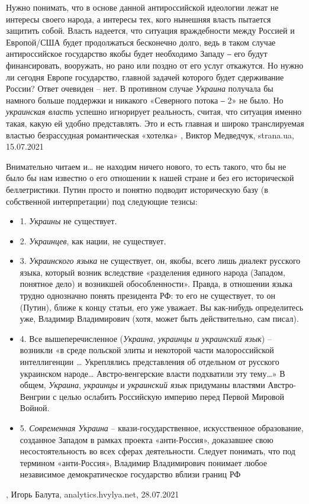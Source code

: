 Нужно понимать, что в основе данной антироссийской идеологии лежат не интересы
своего народа, а интересы тех, кого нынешняя власть пытается защитить собой.
Власть надеется, что ситуация враждебности между Россией и Европой/США будет
продолжаться бесконечно долго, ведь в таком случае антироссийское государство
якобы будет необходимо Западу ‒ его будут финансировать, вооружать, но рано или
поздно от его услуг откажутся.  Но нужно ли сегодня Европе государство, главной
задачей которого будет сдерживание России? Ответ очевиден – нет. В противном
случае \emph{Украина} получала бы намного больше поддержки и никакого
«Северного потока ‒ 2» не было. Но \emph{украинская власть} успешно игнорирует
реальность, считая, что ситуация именно такая, какую ей удобно представлять.
Это и есть главная и широко транслируемая властью безрассудная романтическая
«хотелка»
, 
Виктор Медведчук, strana.ua, 15.07.2021

Внимательно читаем и… не находим ничего нового, то есть такого, что бы не было
бы нам известно о его отношении к нашей стране и без его исторической
беллетристики. Путин просто и понятно подводит историческую базу (в собственной
интерпретации) под следующие тезисы:
\begin{itemize}
\item 1. \emph{Украины} не существует.
\item 2. \emph{Украинцев}, как нации, не существует.
\item 3. \emph{Украинского языка} не существует, он, якобы, всего лишь диалект русского
языка, который возник вследствие «разделения единого народа (Западом, понятное
дело) и возникшей обособленности». Правда, в отношении языка трудно однозначно
понять президента РФ: то его не существует, то он (Путин), ближе к концу
статьи, его уже уважает. Вы как-нибудь определитесь уже, Владимир Владимирович
(хотя, может быть действительно, сам писал).
\item 4. Все вышеперечисленное (\emph{Украина}, \emph{украинцы и украинский язык}) – возникли «в
среде польской элиты и некоторой части малороссийской интеллигенции …
Укреплялись представления об отдельном от русского украинском народе…
Австро-венгерские власти подхватили эту тему…» В общем, \emph{Украина}, \emph{украинцы} и
\emph{украинский язык} придуманы властями Австро-Венгрии с целью ослабить Российскую
империю перед Первой Мировой Войной.
\item 5. \emph{Современная Украина} – квази-государственное, искусственное образование,
созданное Западом в рамках проекта «анти-Россия», доказавшее свою
несостоятельность во всех сферах деятельности. Следует понимать, что под
термином «анти-Россия», Владимир Владимирович понимает любое независимое
демократическое государство вблизи границ РФ
\end{itemize}
, 
Игорь Балута, analytics.hvylya.net, 28.07.2021

